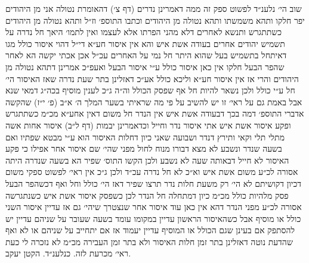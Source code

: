 \documentclass[12pt, openany]{book}
\begin{document}
\begin{multicols}{2}
שוב הי׳ נלענ״ד לפשוט ספק זה ממה דאמרינן נדרים (דף צ׳) דהאומרת נטולה אני מן היהודים יפר חלקו ותהא משמשתו ותהא נטולה מן היהודים וכתבו התוספ׳ וז״ל ותהא נטולה מן היהודים כשתתגרש ותנשא לאחרים דלא מהני הפרתו אלא לעצמו ואין לתמו׳ היאך חל נדרה על תשמיש יהודים אחרים בעודה אשת איש והא אין איסור חע״א די״ל דהוי איסור כולל מגו דאיתחל בתשמיש בעל שהוא היתר חל נמי על האחרים עכ״ל אכן אכתי יקשה הא לאחר שהפר הבעל חלקו אין כאן איסור כולל ע״י איסור הבעל ואעפ״כ אמרינן דתהא נטולה מן היהודים והרי אז אין איסור חע״א וליכא כולל אע״כ דאזלינן בתר שעת נדרה שאז האיסור הי׳ חל ע״י כולל ולכן נשאר להיות חל אף שפסק הכולל וה״ה ג״כ לענין מוסיף בכה״ג דמאי שנא אבל באמת גם על ראי׳ זו יש להשיב על פי מה שראיתי בשער המלך ה׳ א״ב (פ׳ י״ז) שהקשה אדברי התוספ׳ דמה בכך דבעודה אשת איש אין הנדר חל משום דאין אחע״א מכ״מ כשתתגרש ופקע איסור אשת איש אתי איסור נדר וחייל וכדאמרינן יבמות (דף ל״ב) איסור אחות אשה מתלי תלי וקאי ותירץ דנדר ושבועה שאני כיון דחלות האיסור הוא ע״י מבטא שפתיו ואם בשעה שנדר ונשבע לא מצא דבורו מנוח לחול מפני שהי׳ שם איסור אחר אפילו כי פקע האיסור לא חייל דבאותה שעה לא נשבע ולכן הקשו התוס׳ שפיר הא בשעה שנדרה היתה אסורה לכ״ע משום אשת איש וא״כ לא חל נדרה עכ״ד ולכן ג״כ אין ראי׳ לפשוט ספקי משום דכיון דקושיתם לא הי׳ רק משעת חלות נדר תרצו שפיר דאז הי׳ כולל וחל ואף דכשהפר הבעל פסק מלהיות כולל מכ״מ כיון דמתחלה חל הנדר לכן כשפסק איסור אשת איש כשנתגרשה אסורה לכ״ע מפני הנדר דהא אין כאן עוד איסור אחר שנצטרך שיהי׳ גם אז עדיין איסור השני כולל או מוסיף אבל כשהאיסור הראשון עדיין במקומו עומד בשעה שעובר על שניהם עדיין יש להסתפק אם בעינן שגם הכולל או המוסיף עדיין יעמוד אז אם יתחייב על שניהם או לא ואף שהדעת נוטה דאזלינן בתר זמן חלות האיסור ולא בתר זמן העבירה מכ״מ לא נזכרה לי כעת ראי׳ מכרעת לזה. כנלענ״ד. הקטן יעקב.\\\vspace{0pt}

\end{multicols}\newpage
\end{document}
